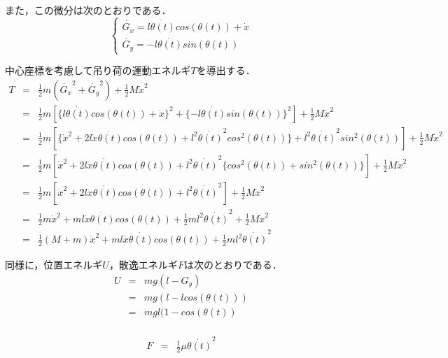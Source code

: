 \documentclass[dvipdfmx,titlepage,a4j]{jsarticle}  %
\begin{document}
また，この微分は次のとおりである．
\begin{equation}
  \begin{cases}
    \dot{G_x} = l \dot{\theta(t)} cos(\theta(t)) + \dot x \nonumber \\
    \dot{G_y} = -l \dot{\theta(t)} sin(\theta(t))
  \end{cases}
\end{equation}

中心座標を考慮して吊り荷の運動エネルギ$T$を導出する．
\begin{eqnarray}
  T &=& \frac{1}{2} m (\dot{G_x}^2 + \dot{G_y}^2) + \frac{1}{2}M\dot{x}^2\nonumber \\
  &=& \frac{1}{2} m [ \{l \dot{\theta(t)} cos(\theta(t)) + \dot x\}^2 + \{ -l \dot{\theta(t)} sin(\theta(t))\}^2 ] + \frac{1}{2}M\dot{x}^2 \nonumber \\
  &=& \frac{1}{2} m [\{ \dot x^2 + 2 l \dot{x} \dot{\theta(t)} cos(\theta(t)) + l^2 \dot{\theta(t)}^2 cos^2(\theta(t)) \} + l^2 \dot{\theta(t)}^2 sin^2(\theta(t))] + \frac{1}{2}M\dot{x}^2 \nonumber \\
  &=& \frac{1}{2} m [\dot x^2 + 2 l \dot{x} \dot{\theta(t)} cos(\theta(t)) + l^2 \dot{\theta(t)}^2 \{ cos^2(\theta(t)) + sin^2(\theta(t)) \}] + \frac{1}{2}M\dot{x}^2 \nonumber \\
  &=& \frac{1}{2} m [\dot x^2 + 2 l \dot{x} \dot{\theta(t)} cos(\theta(t)) + l^2 \dot{\theta(t)}^2] + \frac{1}{2}M\dot{x}^2 \nonumber \\
  &=& \frac{1}{2} m \dot x^2 + m l \dot{x} \dot{\theta(t)} cos(\theta(t)) + \frac{1}{2} m l^2 \dot{\theta(t)}^2 + \frac{1}{2}M\dot{x}^2 \nonumber \\
  &=& \frac{1}{2} (M + m)\dot x^2 + m l \dot{x} \dot{\theta(t)} cos(\theta(t)) + \frac{1}{2} m l^2 \dot{\theta(t)}^2 \label{eq:energy}
\end{eqnarray}

同様に，位置エネルギ$U$，散逸エネルギ$F$は次のとおりである．
\begin{eqnarray}
  U &=& mg(l - G_y) \nonumber \\
  &=& mg(l - l cos(\theta(t))) \nonumber \\
  &=& mgl(1 - cos(\theta(t)) \label{eq:potential}\\
\end{eqnarray}

\begin{eqnarray}
  F &=& \frac{1}{2} \mu  \dot{\theta(t)}^2 \label{eq:friction}
\end{eqnarray}
\end{document}

